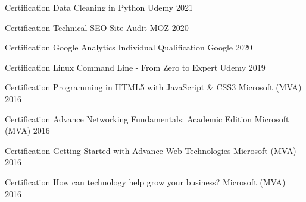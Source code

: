 




\begin{cvhonors}

\cvhonor
{Certification} %
{Data Cleaning in Python} %
{Udemy} %
{2021} %


\cvhonor
{Certification} %
{Technical SEO Site Audit} %
{MOZ} %
{2020} %


\cvhonor
{Certification} %
{Google Analytics Individual Qualification} %
{Google} %
{2020} %


\cvhonor
{Certification} %
{Linux Command Line - From Zero to Expert} %
{Udemy} %
{2019} %

\cvhonor
{Certification} %
{Programming in HTML5 with JavaScript \& CSS3} %
{Microsoft (MVA)} %
{2016} %


\cvhonor
{Certification} %
{Advance Networking Fundamentals: Academic Edition} %
{Microsoft (MVA)} %
{2016} %


\cvhonor
{Certification} %
{Getting Started with Advance Web Technologies} %
{Microsoft (MVA)} %
{2016} %

\cvhonor
{Certification} %
{How can technology help grow your business?} %
{Microsoft (MVA)} %
{2016} %


\end{cvhonors}


